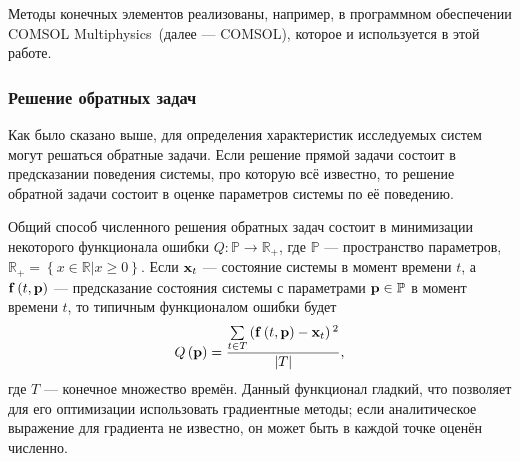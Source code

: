 \documentclass[oneside,final,12pt]{extreport}
\begin{document}
Методы конечных элементов реализованы, например, в программном обеспечении
COMSOL Multiphysics\texttrademark\ (далее --- COMSOL),
которое и используется в этой работе.

\subsubsection*{Решение обратных задач}
Как было сказано выше, для определения характеристик исследуемых систем
могут решаться обратные задачи.
Если решение прямой задачи состоит в предсказании поведения системы,
про которую всё известно, то решение обратной задачи состоит в оценке
параметров системы по её поведению\cite{bib:inverse_pde}.

Общий способ численного решения обратных задач состоит в
минимизации некоторого функционала ошибки $Q:\mathbb{P}\rightarrow\mathbb{R}_+$,
где $\mathbb{P}$ --- пространство параметров,
$\mathbb{R}_+ = \left\{x\in\mathbb{R}|x\geqslant0\right\}$.
Если $\vb x_{t}$ --- состояние системы в момент времени $t$, а
$\vb f\left(t,\vb p\right)$ --- предсказание состояния системы с параметрами
$\vb p \in \mathbb{P}$ в момент времени $t$, то
типичным функционалом ошибки будет
\begin{equation}
Q\left(\vb p\right) =
  \frac{\sum\limits_{t\in T}\left(\vb f\left(t,\vb p\right) - \vb x_t\right){}^2}
       {\left|T\right|},
\end{equation}
где $T$ --- конечное множество времён.
Данный функционал гладкий, что позволяет для его оптимизации использовать
градиентные методы; если аналитическое выражение для градиента не известно,
он может быть в каждой точке оценён численно.
\end{document}

